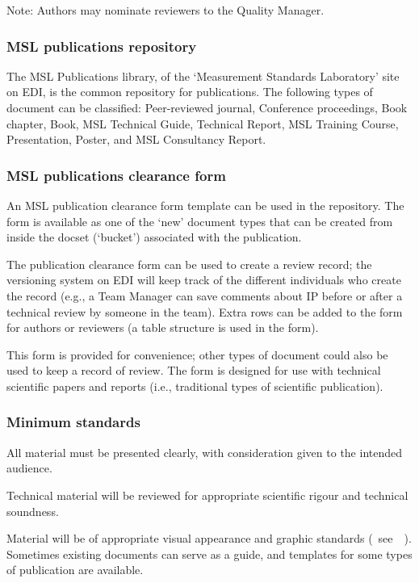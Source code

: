 Note: Authors may nominate reviewers to the Quality Manager.

\subsubsection{MSL publications repository}
 \label{sss:publications_repository}
The MSL Publications library, of the ‘Measurement Standards Laboratory’ site on EDI, is the common repository for publications.  The following types of document can be classified: Peer-reviewed journal, Conference proceedings, Book chapter, Book, MSL Technical Guide, Technical Report, MSL Training Course, Presentation, Poster, and MSL Consultancy Report. 

\subsubsection{MSL publications clearance form}
An MSL publication clearance form template can be used in the repository. The form is available as one of the ‘new’ document types that can be created from inside the docset (‘bucket’) associated with the publication.

The publication clearance form can be used to create a review record; the versioning system on EDI will keep track of the different individuals who create the record (e.g., a Team Manager can save comments about IP before or after a technical review by someone in the team). Extra rows can be added to the form for authors or reviewers (a table structure is used in the form).

This form is provided for convenience; other types of document could also be used to keep a record of review. The form is designed for use with technical scientific papers and reports (i.e., traditional types of scientific publication).  

\subsubsection{Minimum standards}
All material must be presented clearly, with consideration given to the intended audience.

Technical material will be reviewed for appropriate scientific rigour and technical soundness. 

Material will be of appropriate visual appearance and graphic standards (~see~\cite[\S\ref*{GRP-s:scientific_documents}]{MSL_Reporting_Guidelines}~). Sometimes existing documents can serve as a guide, and templates for some types of publication are available.  

